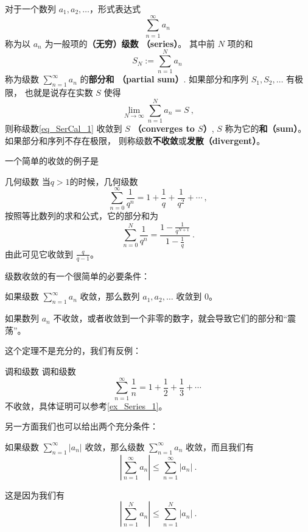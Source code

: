 
\begin{issues}
\issueDraft
\end{issues}


对于一个数列 $a_1,a_2,\dots$，形式表达式
\begin{equation}\label{eq_SerCal_1}
\sum_{n=1}^\infty a_n~
\end{equation}
称为以 $a_n$ 为一般项的\textbf{（无穷）级数 （series）}。 其中前 $N$ 项的和
\begin{equation}
S_N:=\sum_{n=1}^N a_n~
\end{equation}
称为级数 $\sum_{n=1}^\infty a_n$ 的\textbf{部分和 （partial sum）}. 如果部分和序列 $S_1,S_2,\dots$ 有极限， 也就是说存在实数 $S$ 使得
\begin{equation}
\lim_{N\to\infty}\sum_{n=1}^N a_n=S~,
\end{equation}
则称级数\autoref{eq_SerCal_1} 收敛到 $S$ \textbf{（converges to $S$）}, $S$ 称为它的\textbf{和（sum）}。 如果部分和序列不存在极限， 则称级数\textbf{不收敛}或\textbf{发散（divergent）}。

一个简单的收敛的例子是
\begin{example}{几何级数}
当$q > 1$的时候，几何级数
$$
\sum_{n=0}^\infty \frac1{q^n} = 1 + \frac1{q} + \frac1{q^2} + \cdots~,
$$
按照等比数列的求和公式，它的部分和为
$$
\sum_{n=0}^N \frac1{q^n} =\frac{1 - \frac1{q^{N+1}}}{1 - \frac1{q}}~.
$$
由此可见它收敛到 $\frac{q}{q - 1}$。
\end{example}

级数收敛的有一个很简单的必要条件：
\begin{theorem}{}
如果级数 $\sum_{n=1}^\infty a_n$ 收敛，那么数列 $a_1, a_2, \dots$ 收敛到 $0$。
\end{theorem}
如果数列 $a_n$ 不收敛，或者收敛到一个非零的数字，就会导致它们的部分和“震荡”。

这个定理不是充分的，我们有反例：
\begin{example}{调和级数}
调和级数
$$
\sum_{n=1}^\infty\frac{1}{n} = 1 + \frac12 + \frac13 + \cdots~
$$
不收敛，具体证明可以参考\autoref{ex_Series_1}。
\end{example}

另一方面我们也可以给出两个充分条件：
\begin{theorem}{}
如果级数 $\sum_{n=1}^\infty |a_n|$ 收敛，那么级数 $\sum_{n=1}^\infty a_n$ 收敛，而且我们有
$$
\left| \sum_{n=1}^\infty a_n \right| \leq \sum_{n=1}^\infty |a_n| ~.
$$
\end{theorem}
这是因为我们有
$$
\left|\sum_{n=1}^N a_n\right| \leq \sum_{n=1}^N |a_n|~.
$$

